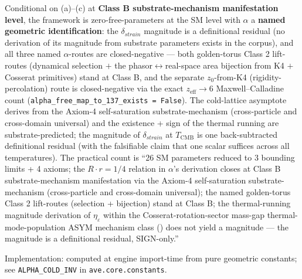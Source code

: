 Conditional on (a)--(c) at \textbf{Class B substrate-mechanism manifestation level}, the framework is zero-free-parameters at the SM level with $\alpha$ a \textbf{named geometric identification}: the $\delta_{strain}$ magnitude is a definitional residual (no derivation of its magnitude from substrate parameters exists in the corpus), and all three named $\alpha$-routes are closed-negative --- both golden-torus Class 2 lift-routes (dynamical selection $+$ the phasor$\leftrightarrow$real-space area bijection from K4 $+$ Cosserat primitives) stand at Class B, and the separate $z_0$-from-K4 (rigidity-percolation) route is closed-negative via the exact $z_{\text{eff}} \to 6$ Maxwell--Calladine count (\texttt{alpha\_free\_map\_to\_137\_exists = False}).
The cold-lattice asymptote derives from the Axiom-4 self-saturation substrate-mechanism (cross-particle and cross-domain universal) and the existence + sign of the thermal running are substrate-predicted; the magnitude of $\delta_{strain}$ at $T_{\text{CMB}}$ is one back-subtracted definitional residual (with the falsifiable claim that one scalar suffices across all temperatures). The practical count is ``26 SM parameters reduced to 3 bounding limits + 4 axioms; the $R \cdot r = 1/4$ relation in $\alpha$'s derivation closes at Class B substrate-mechanism manifestation via the Axiom-4 self-saturation substrate-mechanism (cross-particle and cross-domain universal); the named golden-torus Class 2 lift-routes (selection + bijection) stand at Class B; the thermal-running magnitude derivation of $\eta_\varepsilon$ within the Cosserat-rotation-sector mass-gap thermal-mode-population ASYM mechanism class () does not yield a magnitude --- the magnitude is a definitional residual, SIGN-only.''

Implementation: computed at engine import-time from pure geometric constants; see \texttt{ALPHA\_COLD\_INV} in \texttt{ave.core.constants}.


